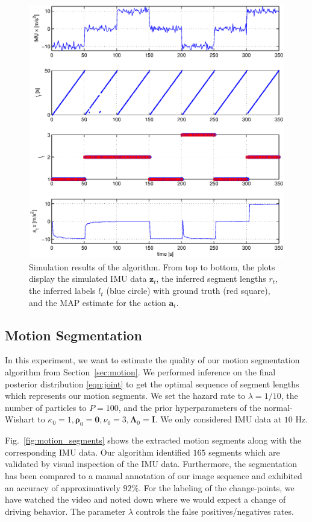 \begin{figure}[t]
\centering
\includegraphics[width=0.8\columnwidth]{fig/simResult.eps}
\caption{Simulation results of the algorithm. From top to bottom, the
  plots display the simulated IMU data $\mathbf{z}_t$, the inferred
  segment lengths $r_t$, the inferred labels $l_t$ (blue circle) with
  ground truth (red square), and the MAP estimate for the action
  $\mathbf{a}_t$.}
\label{fig:simulation}
\end{figure}

\subsection{Motion Segmentation}
In this experiment, we want to estimate the quality of our motion segmentation
algorithm from Section~\ref{sec:motion}. We performed inference on the
final posterior distribution \eqref{eqn:joint} to get the optimal
sequence of segment lengths which represents our motion segments. We set the
hazard rate to $\lambda=1/10$, the number of particles to $P=100$, and the prior
hyperparameters of the normal-Wishart to $\kappa_0=1,
\boldsymbol{\rho}_0=\mathbf{0},\nu_0=3,\boldsymbol{\Lambda}_0=\mathbf{I}$. We
only considered IMU data at $10$ Hz.

Fig.~\ref{fig:motion_segments} shows the extracted motion segments along with
the corresponding IMU data. Our algorithm identified $165$ segments which are
validated by visual inspection of the IMU data. Furthermore, the segmentation
has been compared to a manual annotation of our image sequence and exhibited an
accuracy of approximatively $92\%$. For the labeling of the change-points, we
have watched the video and noted down where we would expect a change of driving
behavior. The parameter $\lambda$ controls the false positives/negatives rates.

